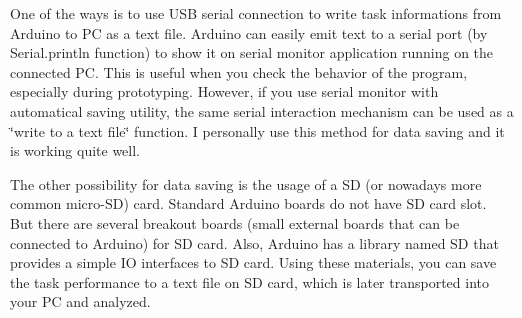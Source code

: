 One of the ways is to use U\+SB serial connection to write task informations from Arduino to PC as a text file. Arduino can easily emit text to a serial port (by {\ttfamily Serial.\+println} function) to show it on serial monitor application running on the connected PC. This is useful when you check the behavior of the program, especially during prototyping. However, if you use serial monitor with automatical saving utility, the same serial interaction mechanism can be used as a \char`\"{}write to a text file\char`\"{} function. I personally use this method for data saving and it is working quite well.

The other possibility for data saving is the usage of a SD (or nowadays more common micro-\/\+SD) card. Standard Arduino boards do not have SD card slot. But there are several breakout boards (small external boards that can be connected to Arduino) for SD card. Also, Arduino has a library named {\ttfamily SD} that provides a simple IO interfaces to SD card. Using these materials, you can save the task performance to a text file on SD card, which is later transported into your PC and analyzed. 
